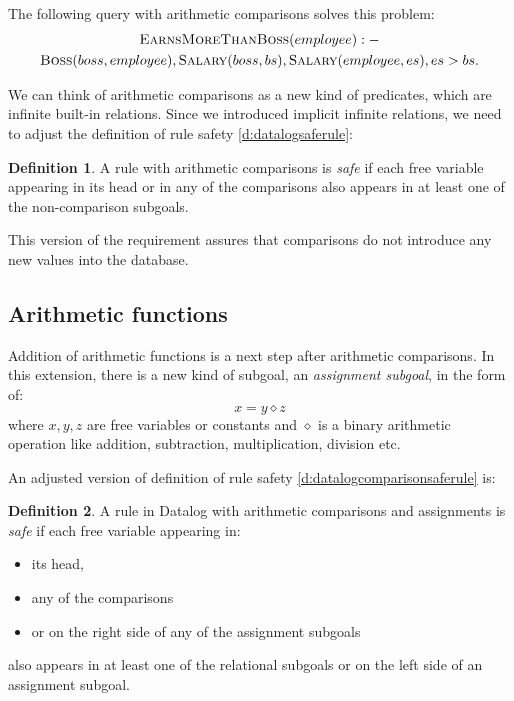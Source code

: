 \documentclass{pracamgr}
\theoremstyle{plain}
\theoremstyle{definition}
\newtheorem{defn}{Definition}[section]
\theoremstyle{remark}
\begin{document}
The following query with arithmetic comparisons solves this problem:
\begin{multline*}
\textsc{EarnsMoreThanBoss} (employee) :- \\ \textsc{Boss}(boss, employee), \textsc{Salary}(boss, bs), \textsc{Salary}(employee, es), es > bs. \\
\end{multline*}

We can think of arithmetic comparisons as a new kind of predicates, which are infinite built-in relations. Since we introduced implicit infinite relations, we need to adjust the definition of rule safety \ref{d:datalogsaferule}:

\begin{defn}
A rule with arithmetic comparisons is \emph{safe} if each free variable appearing in its head or in any of the comparisons also appears in at least one of the non-comparison subgoals.
\end{defn}\label{d:datalogcomparisonsaferule}

This version of the requirement assures that comparisons do not introduce any new values into the database.

\subsection{Arithmetic functions}

Addition of arithmetic functions is a next step after arithmetic comparisons. In this extension, there is a new kind of subgoal, an \emph{assignment subgoal}, in the form of:
$$x = y \diamond z$$
where $x, y, z$ are free variables or constants and $\diamond$ is a binary arithmetic operation like addition, subtraction, multiplication, division etc.


An adjusted version of definition of rule safety \ref{d:datalogcomparisonsaferule} is:

\begin{defn}
A rule in Datalog with arithmetic comparisons and assignments is \emph{safe} if each free variable appearing in:
\begin{itemize}
\item its head,
\item any of the comparisons 
\item or on the right side of any of the assignment subgoals
\end{itemize}
also appears in at least one of the relational subgoals or on the left side of an assignment subgoal.
\end{defn}\label{d:datalogeqsaferule}
\end{document}
